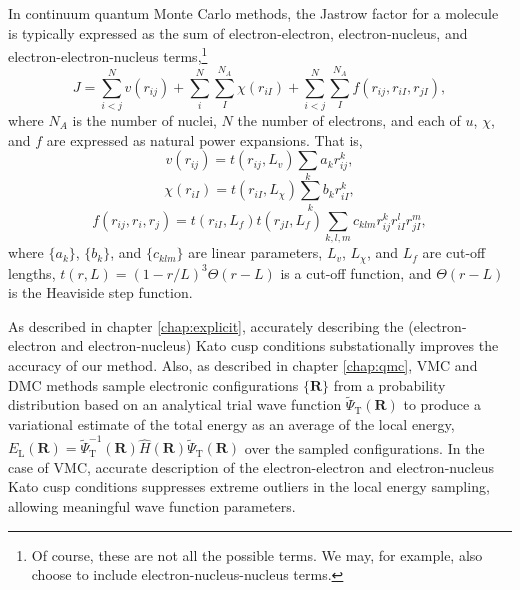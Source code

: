 In continuum quantum Monte Carlo methods, the Jastrow factor for a molecule is typically expressed as the sum of electron-electron, electron-nucleus, and electron-electron-nucleus terms,\footnote{Of course, these are not all the possible terms. We may, for example, also choose to include electron-nucleus-nucleus terms.}
\begin{equation}
    \label{eq:jastrow}
    J = \sum_{i<j}^Nv(r_{ij}) + \sum_i^N\sum_I^{N_A}\chi(r_{iI}) + \sum_{i<j}^N\sum_I^{N_A}f(r_{ij}, r_{iI}, r_{jI}),
\end{equation}
where $N_A$ is the number of nuclei, $N$ the number of electrons, and each of $u$, $\chi$, and $f$ are expressed as natural power expansions. That is,
\begin{equation}
    \label{eq:dtn-jastrow-ee}
    v(r_{ij})    = t(r_{ij},L_v)
                    \sum_{k} a_k r_{ij}^k ,
\end{equation}
\begin{equation}
    \label{eq:dtn-jastrow-en}
    \chi(r_{iI}) = t(r_{iI},L_\chi)
    \sum_{k} b_k r_{iI}^k ,
\end{equation}
\begin{equation}
    \label{eq:dtn-jastrow-een}
    f(r_{ij}, r_{i}, r_{j}) = t(r_{iI},L_f) t(r_{jI},L_f)
    \sum_{k,l,m} c_{klm}
    r_{ij}^k r_{iI}^l r_{jI}^m ,
\end{equation}
where $\{a_k\}$, $\{b_k\}$, and $\{c_{klm}\}$ are linear parameters,
$L_v$, $L_\chi$, and $L_f$ are cut-off lengths, $t(r,L) = (1-r/L)^3
\Theta(r-L)$ is a cut-off function, and $\Theta(r-L)$ is the Heaviside
step function.

As described in chapter \ref{chap:explicit}, accurately describing the (electron-electron and electron-nucleus) Kato cusp conditions\supercite{katoEigenfunctionsManyparticleSystems1957a} substationally improves the accuracy of our method. Also, as described in chapter \ref{chap:qmc}, \gls{VMC} and \gls{DMC} methods sample electronic configurations $\{\mathbf R\}$ from a probability distribution based on an analytical trial wave function $\tilde\Psi_{\mathrm T}(\mathbf R)$ to produce a variational estimate of the total energy as an average of the local energy, $E_{\mathrm L}({\mathbf R}) = \tilde\Psi_{\mathrm T}^{-1}({\mathbf R}) \hat H({\mathbf R}) \tilde\Psi_{\mathrm T}({\mathbf R})$ over the sampled configurations. In the case of \gls{VMC}, accurate description of the electron-electron and electron-nucleus Kato cusp conditions suppresses extreme outliers in the local energy sampling, allowing meaningful wave function parameters.

